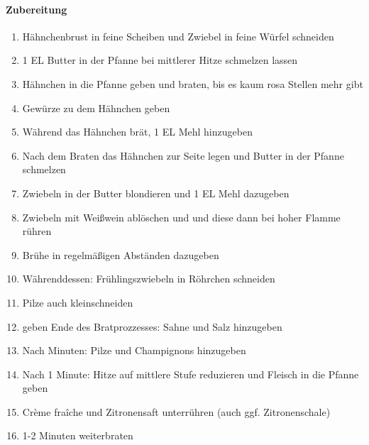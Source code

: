 \paragraph{Zubereitung}
\begin{enumerate}[noitemsep]
	\item Hähnchenbrust in feine Scheiben und Zwiebel in feine Würfel schneiden
	\item 1 EL Butter in der Pfanne bei mittlerer Hitze schmelzen lassen
	\item Hähnchen in die Pfanne geben und braten, bis es kaum rosa Stellen mehr gibt
	\item Gewürze zu dem Hähnchen geben 
	\item Während das Hähnchen brät, 1 EL Mehl hinzugeben 
	\item Nach dem Braten das Hähnchen zur Seite legen und Butter in der Pfanne schmelzen 
	\item Zwiebeln in der Butter blondieren und 1 EL Mehl dazugeben 
	\item Zwiebeln mit Weißwein ablöschen und und diese dann bei hoher Flamme rühren 
	\item Brühe in regelmäßigen Abständen dazugeben
	\item Währenddessen: Frühlingszwiebeln in Röhrchen schneiden
	\item Pilze auch kleinschneiden 
	\item geben Ende des Bratprozzesses: Sahne und Salz hinzugeben
	\item Nach Minuten: Pilze und Champignons hinzugeben 
	\item Nach 1 Minute: Hitze auf mittlere Stufe reduzieren und Fleisch in die Pfanne geben
	\item Crème fraîche und Zitronensaft unterrühren (auch ggf. Zitronenschale)
	\item 1-2 Minuten weiterbraten
\end{enumerate}
